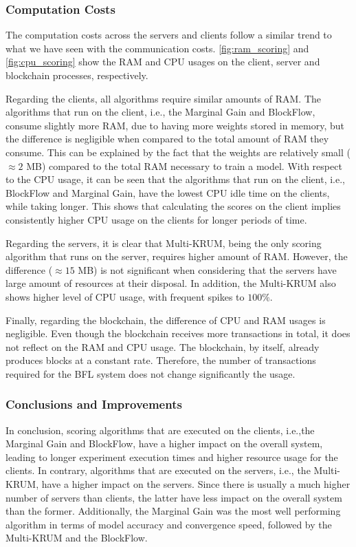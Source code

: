 \subsubsection{Computation Costs}

The computation costs across the servers and clients follow a similar trend to what we have seen with the communication costs. \autoref{fig:ram_scoring} and \autoref{fig:cpu_scoring} show the RAM and CPU usages on the client, server and blockchain processes, respectively.

Regarding the clients, all algorithms require similar amounts of RAM. The algorithms that run on the client, i.e., the Marginal Gain and BlockFlow, consume slightly more RAM, due to having more weights stored in memory, but the difference is negligible when compared to the total amount of RAM they consume. This can be explained by the fact that the weights are relatively small ($\approx 2$ MB) compared to the total RAM necessary to train a model. With respect to the CPU usage, it can be seen that the algorithms that run on the client, i.e., BlockFlow and Marginal Gain, have the lowest CPU idle time on the clients, while taking longer. This shows that calculating the scores on the client implies consistently higher CPU usage on the clients for longer periods of time.

Regarding the servers, it is clear that Multi-KRUM, being the only scoring algorithm that runs on the server, requires higher amount of RAM. However, the difference ($\approx 15$ MB) is not significant when considering that the servers have large amount of resources at their disposal. In addition, the Multi-KRUM also shows higher level of CPU usage, with frequent spikes to $100\%$.

Finally, regarding the blockchain, the difference of CPU and RAM usages is negligible. Even though the blockchain receives more transactions in total, it does not reflect on the RAM and CPU usage. The blockchain, by itself, already produces blocks at a constant rate. Therefore, the number of transactions required for the BFL system does not change significantly the usage.

\subsubsection{Conclusions and Improvements}

In conclusion, scoring algorithms that are executed on the clients, i.e.,the Marginal Gain and BlockFlow, have a higher impact on the overall system, leading to longer experiment execution times and higher resource usage for the clients. In contrary, algorithms that are executed on the servers, i.e., the Multi-KRUM, have a higher impact on the servers. Since there is usually a much higher number of servers than clients, the latter have less impact on the overall system than the former. Additionally, the Marginal Gain was the most well performing algorithm in terms of model accuracy and convergence speed, followed by the Multi-KRUM and the BlockFlow.

